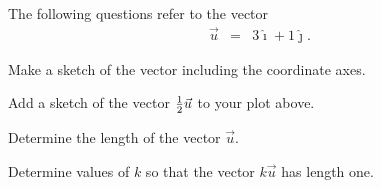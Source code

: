
\begin{problem}
\item The following questions refer to the vector
\begin{eqnarray*}
  \vec{u} & = & 3 \hat{\imath} + 1 \hat{\jmath}.
\end{eqnarray*}
\begin{subproblem}
    \item Make a sketch of the vector including the coordinate axes.
    \vfill
    \item Add a sketch of the vector $\mbox{$\frac{1}{2}$} \vec{u}$ to your plot above.
    \item Determine the length of the vector $\vec{u}$.
    \vfill
    \item Determine values of $k$ so that the vector $k \vec{u}$ has length one.
    \vfill
\end{subproblem}
\end{problem}


